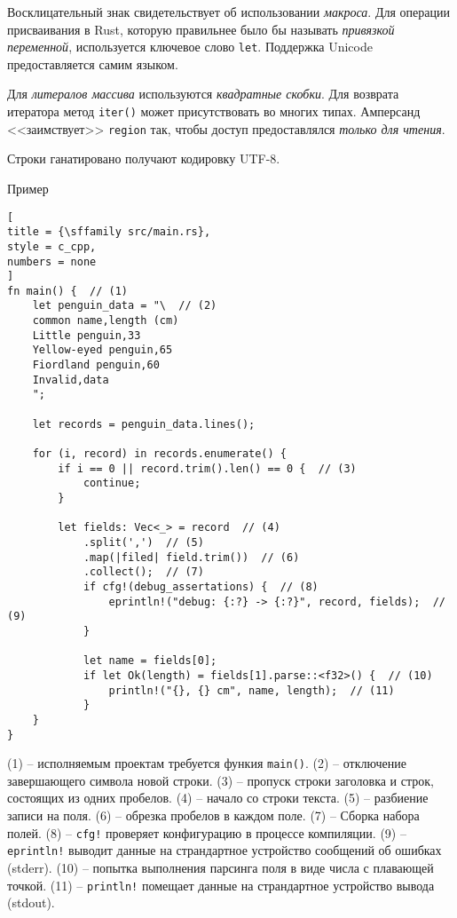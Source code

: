 \documentclass[%
	11pt,
	a4paper,
	utf8,
		]{article}
\begin{document}
Восклицательный знак свидетельствует об использовании \emph{макроса}. Для операции присваивания в Rust, которую правильнее было бы называть \emph{привязкой переменной}, используется ключевое слово \texttt{let}. Поддержка Unicode предоставляется самим языком. 

Для \emph{литералов массива} используются \emph{квадратные скобки}. Для возврата итератора метод \texttt{iter()} может присутствовать во многих типах. Амперсанд <<заимствует>> \texttt{region} так, чтобы доступ предоставлялся \emph{только для чтения}.

Строки ганатировано получают кодировку UTF-8.

Пример
\begin{lstlisting}[
title = {\sffamily src/main.rs},
style = c_cpp,
numbers = none
]
fn main() {  // (1)
    let penguin_data = "\  // (2)
    common name,length (cm)
    Little penguin,33
    Yellow-eyed penguin,65
    Fiordland penguin,60
    Invalid,data
    ";
    
    let records = penguin_data.lines();
    
    for (i, record) in records.enumerate() {
        if i == 0 || record.trim().len() == 0 {  // (3)
            continue;
        }
    
        let fields: Vec<_> = record  // (4)
            .split(',')  // (5)
            .map(|filed| field.trim())  // (6)
            .collect();  // (7)
            if cfg!(debug_assertations) {  // (8)
                eprintln!("debug: {:?} -> {:?}", record, fields);  // (9)
            }
        
            let name = fields[0];
            if let Ok(length) = fields[1].parse::<f32>() {  // (10)
                println!("{}, {} cm", name, length);  // (11)
            }
    }
}
\end{lstlisting}

(1) -- исполняемым проектам требуется функия \texttt{main()}. (2) -- отключение завершающего символа новой строки. (3) -- пропуск строки заголовка и строк, состоящих из одних пробелов. (4) -- начало со строки текста. (5) -- разбиение записи на поля. (6) -- обрезка пробелов в каждом поле. (7) -- Сборка набора полей. (8) -- \texttt{cfg!} проверяет конфигурацию в процессе компиляции. (9) -- \texttt{eprintln!} выводит данные на страндартное устройство сообщений об ошибках (stderr). (10) -- попытка выполнения парсинга поля в виде числа с плавающей точкой. (11) -- \texttt{println!} помещает данные на страндартное устройство вывода (stdout).
\end{document}

